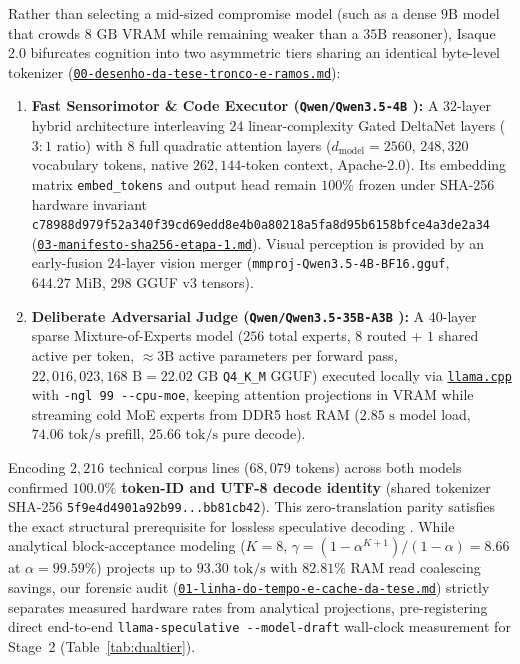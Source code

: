 \documentclass[10pt,a4paper]{article}
\begin{document}
Rather than selecting a mid-sized compromise model (such as a dense $9\text{B}$ model that crowds $8\text{ GB}$ VRAM while remaining weaker than a $35\text{B}$ reasoner), Isaque 2.0 bifurcates cognition into two asymmetric tiers sharing an identical byte-level tokenizer (\href{https://drive.google.com/file/d/1zaJmQCAw1C6ejkSifc1Rp-4uwnenmSwq/view?usp=drivesdk}{\texttt{00-desenho-da-tese-tronco-e-ramos.md}}):
\begin{enumerate}
  \item \textbf{Fast Sensorimotor \& Code Executor (\texttt{Qwen/Qwen3.5-4B} \cite{qwen35_4b}):} A $32$-layer hybrid architecture interleaving $24$ linear-complexity Gated DeltaNet layers \cite{yang2025gated} ($3:1$ ratio) with $8$ full quadratic attention layers ($d_{\text{model}}=2560$, $248,320$ vocabulary tokens, native $262,144$-token context, Apache-2.0). Its embedding matrix \texttt{embed\_\allowbreak{}tokens} and output head remain $100\%$ frozen under SHA-256 hardware invariant \texttt{c78988d9\allowbreak{}79f52a34\allowbreak{}0f39cd69\allowbreak{}edd8e4b0\allowbreak{}a80218a5\allowbreak{}fa8d95b6\allowbreak{}158bfce4\allowbreak{}a3de2a34} (\href{https://drive.google.com/file/d/1-1KKupaUYBWjDUcLjemQH0FBSPmnCSj6/view?usp=drivesdk}{\texttt{03-manifesto-sha256-etapa-1.md}}). Visual perception is provided by an early-fusion $24$-layer vision merger (\texttt{mmproj-Qwen3.5-4B-BF16.gguf}, $644.27\text{ MiB}$, $298$ GGUF v3 tensors).
  \item \textbf{Deliberate Adversarial Judge (\texttt{Qwen/Qwen3.5-35B-A3B} \cite{qwen35_4b}):} A $40$-layer sparse Mixture-of-Experts model ($256$ total experts, $8$ routed + $1$ shared active per token, $\approx 3\text{B}$ active parameters per forward pass, $22,016,023,168\text{ B} = 22.02\text{ GB}$ \texttt{Q4\_\allowbreak{}K\_\allowbreak{}M} GGUF) executed locally via \href{https://github.com/ggml-org/llama.cpp}{\texttt{llama.cpp}} \cite{llamacpp} with \texttt{-ngl 99 -{}-cpu-moe}, keeping attention projections in VRAM while streaming cold MoE experts from DDR5 host RAM ($2.85\text{ s}$ model load, $74.06\text{ tok/s}$ prefill, $25.66\text{ tok/s}$ pure decode).
\end{enumerate}

Encoding $2,216$ technical corpus lines ($68,079$ tokens) across both models confirmed \textbf{$100.0\%$ token-ID and UTF-8 decode identity} (shared tokenizer SHA-256 \texttt{5f9e4d4901a92b99...bb81cb42}). This zero-translation parity satisfies the exact structural prerequisite for lossless speculative decoding \cite{leviathan2023speculative}. While analytical block-acceptance modeling ($K=8$, $\gamma = (1-\alpha^{K+1})/(1-\alpha) = 8.66$ at $\alpha=99.59\%$) projects up to $93.30\text{ tok/s}$ with $82.81\%$ RAM read coalescing savings, our forensic audit (\href{https://drive.google.com/file/d/16-3o4ykaOOKaW-S2VTHzpE7Uhj1BA0tl/view?usp=drivesdk}{\texttt{01-linha-do-tempo-e-cache-da-tese.md}}) strictly separates measured hardware rates from analytical projections, pre-registering direct end-to-end \texttt{llama-speculative -{}-model-draft} wall-clock measurement for Stage~2 (Table~\ref{tab:dualtier}).
\end{document}
